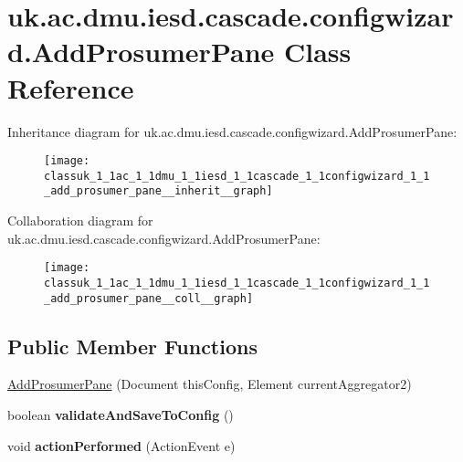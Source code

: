 \hypertarget{classuk_1_1ac_1_1dmu_1_1iesd_1_1cascade_1_1configwizard_1_1_add_prosumer_pane}{\section{uk.\-ac.\-dmu.\-iesd.\-cascade.\-configwizard.\-Add\-Prosumer\-Pane Class Reference}
\label{classuk_1_1ac_1_1dmu_1_1iesd_1_1cascade_1_1configwizard_1_1_add_prosumer_pane}
}


Inheritance diagram for uk.\-ac.\-dmu.\-iesd.\-cascade.\-configwizard.\-Add\-Prosumer\-Pane\-:\nopagebreak
\begin{figure}[H]
\begin{center}
\leavevmode
\texttt{[image: classuk\_1\_1ac\_1\_1dmu\_1\_1iesd\_1\_1cascade\_1\_1configwizard\_1\_1\_add\_prosumer\_pane\_\_inherit\_\_graph]}
\end{center}
\end{figure}


Collaboration diagram for uk.\-ac.\-dmu.\-iesd.\-cascade.\-configwizard.\-Add\-Prosumer\-Pane\-:\nopagebreak
\begin{figure}[H]
\begin{center}
\leavevmode
\texttt{[image: classuk\_1\_1ac\_1\_1dmu\_1\_1iesd\_1\_1cascade\_1\_1configwizard\_1\_1\_add\_prosumer\_pane\_\_coll\_\_graph]}
\end{center}
\end{figure}
\subsection*{Public Member Functions}
\begin{DoxyCompactItemize}
\item 
\hyperlink{classuk_1_1ac_1_1dmu_1_1iesd_1_1cascade_1_1configwizard_1_1_add_prosumer_pane_a4b14b119666e14b21d7feeea5a89a399}{Add\-Prosumer\-Pane} (Document this\-Config, Element current\-Aggregator2)
\item 
\hypertarget{classuk_1_1ac_1_1dmu_1_1iesd_1_1cascade_1_1configwizard_1_1_add_prosumer_pane_adcd78b446ecad905ddecef130abff6b4}{boolean {\bfseries validate\-And\-Save\-To\-Config} ()}\label{classuk_1_1ac_1_1dmu_1_1iesd_1_1cascade_1_1configwizard_1_1_add_prosumer_pane_adcd78b446ecad905ddecef130abff6b4}

\item 
\hypertarget{classuk_1_1ac_1_1dmu_1_1iesd_1_1cascade_1_1configwizard_1_1_add_prosumer_pane_a36a7c20f1f83136676d22c2ba6754869}{void {\bfseries action\-Performed} (Action\-Event e)}\label{classuk_1_1ac_1_1dmu_1_1iesd_1_1cascade_1_1configwizard_1_1_add_prosumer_pane_a36a7c20f1f83136676d22c2ba6754869}

\end{DoxyCompactItemize}
